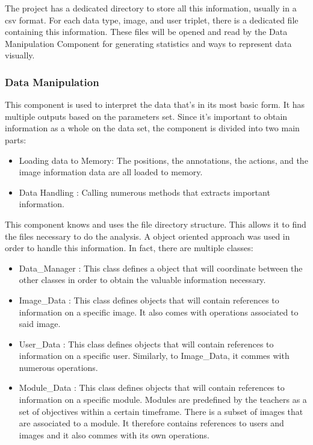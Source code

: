 \documentclass[a4paper,11pt]{report}
\numberwithin{figure}{section} %
\begin{document}
        
        The project has a dedicated directory to store all this information, usually in a csv format. For each data type, image, and user triplet, there is a dedicated file containing this information. These files will be opened and read by the Data Manipulation Component for generating statistics and ways to represent data visually.
        
        
	\subsubsection{Data Manipulation}
    
    This component is used to interpret the data that's in its most basic form. It has multiple outputs based on the parameters set. Since it's important to obtain information as a whole on the data set, the component is divided into two main parts:
    \begin{itemize}
        \item[\textbullet] Loading data to Memory: The positions, the annotations, the actions, and the image information data are all loaded to memory.
        \item[\textbullet] Data Handling : Calling numerous methods that extracts important information.
    \end{itemize}

    This component knows and uses the file directory structure. This allows it to find the files necessary to do the analysis.
    A object oriented approach was used in order to handle this information. In fact, there are multiple classes:

    \begin{itemize}
        \item[\textbullet] Data\_Manager : This class defines a object that will coordinate between the other classes in order to obtain the valuable information necessary.
        \item[\textbullet] Image\_Data : This class defines objects that will contain references to information on a specific image. It also comes with operations associated to said image.
        \item[\textbullet] User\_Data : This class defines objects that will contain references to information on a specific user. Similarly, to Image\_Data, it commes with numerous operations.
        \item[\textbullet] Module\_Data : This class defines objects that will contain references to information on a specific module. Modules are predefined by the teachers as a set of objectives within a certain timeframe. There is a subset of images that are associated to a module. It therefore contains references to users and images and it also commes with its own operations.
    \end{itemize}
\end{document}
